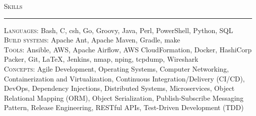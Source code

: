 \documentclass{res}
\begin{document}
\begin{resume}
\textsc{{\Large Skills}}
\vspace{0.5mm}
\hrule width18.5cm
\textsc{Languages:} Bash, C, csh, Go, Groovy, Java, Perl, PowerShell, Python, SQL\\[2mm]
\textsc{Build systems:} Apache Ant, Apache Maven, Gradle, make\\[2mm]
\textsc{Tools:} Ansible, AWS, Apache Airflow, AWS CloudFormation, Docker, HashiCorp Packer, Git, \LaTeX, Jenkins, nmap, nping, tcpdump, Wireshark\\[2mm]
\textsc{Concepts:} Agile Development, Operating Systems, Computer Networking, Containerization and Virtualization, Continuous Integration/Delivery (CI/CD), DevOps, Dependency Injections, Distributed Systems, Microservices, Object Relational Mapping (ORM), Object Serialization, Publish-Subscribe Messaging Pattern, Release Engineering, RESTful APIs, Test-Driven Development (TDD)\\[0.5mm]
\vspace{-2mm}
\end{resume}
\end{document}
